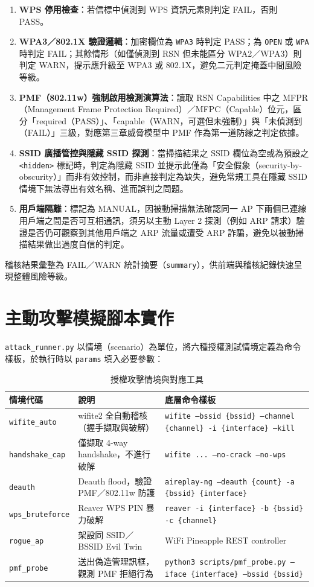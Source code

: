 \documentclass[12pt,a4paper,oneside]{report}
\begin{document}
\begin{enumerate}
  \item \textbf{WPS 停用檢查}：若信標中偵測到 WPS 資訊元素則判定 FAIL，否則 PASS。
  \item \textbf{WPA3／802.1X 驗證邏輯}：加密欄位為 \texttt{WPA3} 時判定 PASS；為 \texttt{OPEN} 或 \texttt{WPA} 時判定 FAIL；其餘情形（如僅偵測到 RSN 但未能區分 WPA2／WPA3）則判定 WARN，提示應升級至 WPA3 或 802.1X，避免二元判定掩蓋中間風險等級。
  \item \textbf{PMF（802.11w）強制啟用檢測演算法}：讀取 RSN Capabilities 中之 MFPR（Management Frame Protection Required）／MFPC（Capable）位元，區分「required（PASS）」、「capable（WARN，可選但未強制）」與「未偵測到（FAIL）」三級，對應第三章威脅模型中 PMF 作為第一道防線之判定依據。
  \item \textbf{SSID 廣播管控與隱藏 SSID 探測}：當掃描結果之 SSID 欄位為空或為預設之 \texttt{<hidden>} 標記時，判定為隱藏 SSID 並提示此僅為「安全假象（security-by-obscurity）」而非有效控制，而非直接判定為缺失，避免常規工具在隱藏 SSID 情境下無法導出有效名稱、進而誤判之問題。
  \item \textbf{用戶端隔離}：標記為 MANUAL，因被動掃描無法確認同一 AP 下兩個已連線用戶端之間是否可互相通訊，須另以主動 Layer 2 探測（例如 ARP 請求）驗證是否仍可觀察到其他用戶端之 ARP 流量或遭受 ARP 詐騙\cite{mirzoev2012isolation}，避免以被動掃描結果做出過度自信的判定。
\end{enumerate}
稽核結果彙整為 FAIL／WARN 統計摘要（\texttt{summary}），供前端與稽核紀錄快速呈現整體風險等級。

\section{主動攻擊模擬腳本實作}
\texttt{attack\_runner.py} 以情境（scenario）為單位，將六種授權測試情境定義為命令樣板，於執行時以 \texttt{params} 填入必要參數：

\begin{longtable}{p{}p{}p{}}
\caption{授權攻擊情境與對應工具}\label{tab:scenarios}\\
\toprule
情境代碼 & 說明 & 底層命令樣板 \\
\midrule
\texttt{wifite\_auto} & wifite2 全自動稽核（握手擷取與破解） & \texttt{wifite --bssid \{bssid\} --channel \{channel\} -i \{interface\} --kill} \\
\texttt{handshake\_cap} & 僅擷取 4-way handshake，不進行破解 & \texttt{wifite ... --no-crack --no-wps} \\
\texttt{deauth} & Deauth flood，驗證 PMF／802.11w 防護 & \texttt{aireplay-ng --deauth \{count\} -a \{bssid\} \{interface\}} \\
\texttt{wps\_bruteforce} & Reaver WPS PIN 暴力破解 & \texttt{reaver -i \{interface\} -b \{bssid\} -c \{channel\}} \\
\texttt{rogue\_ap} & 架設同 SSID／BSSID Evil Twin & WiFi Pineapple REST controller \\
\texttt{pmf\_probe} & 送出偽造管理訊框，觀測 PMF 拒絕行為 & \texttt{python3 scripts/pmf\_probe.py --iface \{interface\} --bssid \{bssid\}} \\
\bottomrule
\end{longtable}
\end{document}
